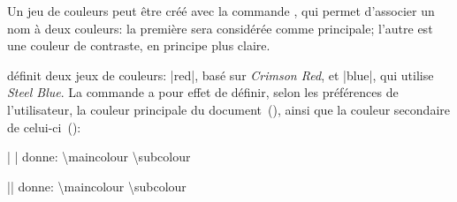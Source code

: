 \begin{noprint}
\newcommand{\setcolourscheme}[3]{%
	\expandafter\gdef\csname setmaincolour@#1\endcsname{\color[HTML]{#2}}%
	\expandafter\gdef\csname setsubcolour@#1\endcsname{\color[HTML]{#3}}}
\newcommand{\setcolours}[1]{%
	\gdef\maincolour{\csname setmaincolour@#1\endcsname}%
	\gdef\subcolour{\csname setsubcolour@#1\endcsname}}
\end{noprint}

\begin{developer}
Un jeu de couleurs peut être créé avec la commande , qui permet d'associer un nom à deux couleurs: la première sera considérée comme principale; l'autre est une couleur de contraste, en principe plus claire.\par
\vspace{-\baselineskip}
\begin{macro}
\end{macro}
\end{developer}

\begin{noprint}
\end{noprint}

\frenchlaw définit deux jeux de couleurs: |red|, basé sur \emph{Crimson Red}, et |blue|, qui utilise \emph{Steel Blue}. La commande  a pour effet de définir, selon les préférences de l'utilisateur, la couleur principale du document~(), ainsi que la couleur secondaire de celui-ci~():

\noindent\bgroup{}| | donne: \hfill {\maincolour\ttfamily\space\textbackslash maincolour} \hfill {\subcolour\ttfamily\textbackslash subcolour}\egroup

\noindent\bgroup{}|| donne: \hfill {\maincolour\ttfamily\textbackslash maincolour} \hfill {\subcolour\ttfamily\textbackslash subcolour}\egroup

